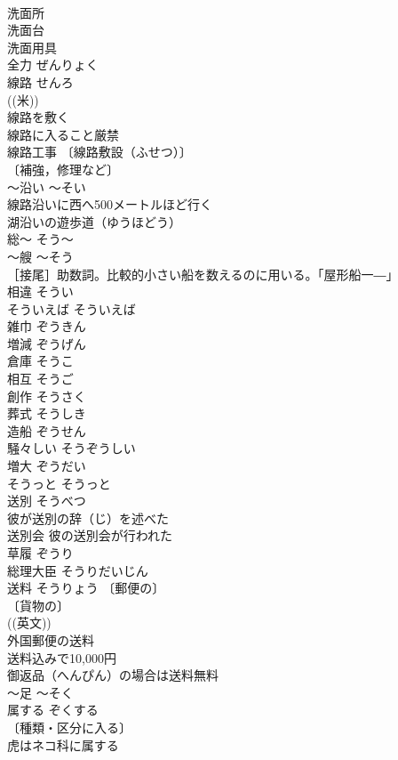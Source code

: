 \documentclass[8pt]{extreport}
\begin{document}
\begin{CJK}{UTF8}{min}
\\	洗面所 
\\	洗面台 
\\	洗面用具 
\\	全力	ぜんりょく	
\\	線路	せんろ	
\\	((米)) 
\\	線路を敷く 
\\	線路に入ること厳禁 
\\	線路工事 〔線路敷設（ふせつ）〕
\\	〔補強，修理など〕
\\	～沿い	～そい	
\\	線路沿いに西へ500メートルほど行く 
\\	湖沿いの遊歩道（ゆうほどう） 
\\	総～	そう～	
\\	～艘	～そう	
\\	［接尾］助数詞。比較的小さい船を数えるのに用いる。「屋形船一―」
\\	相違	そうい	
\\	そういえば	そういえば	
\\	雑巾	ぞうきん	
\\	増減	ぞうげん	
\\	倉庫	そうこ	
\\	相互	そうご	
\\	創作	そうさく	
\\	葬式	そうしき	
\\	造船	ぞうせん	
\\	騒々しい	そうぞうしい	
\\	増大	ぞうだい	
\\	そうっと	そうっと	
\\	送別	そうべつ	
\\	彼が送別の辞（じ）を述べた 
\\	送別会 彼の送別会が行われた 
\\	草履	ぞうり	
\\	総理大臣	そうりだいじん	
\\	送料	そうりょう	〔郵便の〕
\\	〔貨物の〕
\\	((英文)) 
\\	外国郵便の送料 
\\	送料込みで10,000円 
\\	御返品（へんぴん）の場合は送料無料 
\\	～足	～そく	
\\	属する	ぞくする	
\\	〔種類・区分に入る〕
\\	虎はネコ科に属する 

\end{CJK}
\end{document}
